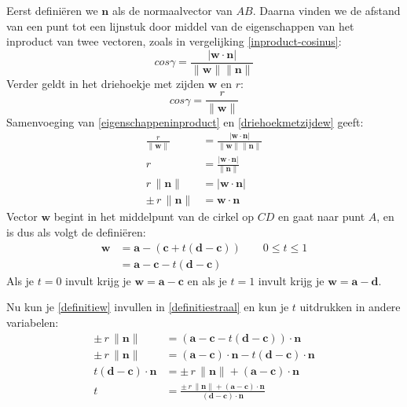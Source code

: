 \documentclass[12pt,a4paper]{article}
\begin{document}
	Eerst defini\"{e}ren we $\mathbf{n}$ als de normaalvector van $AB$. Daarna vinden we de afstand van een punt tot een lijnstuk door middel van de eigenschappen van het inproduct van twee vectoren, zoals in vergelijking \eqref{inproduct-cosinus}:
	\begin{equation}
		\label{eigenschappeninproduct}
		cos \gamma = \frac{|\mathbf{w} \cdot \mathbf{n}|}{\| \mathbf{w} \| \| \mathbf{n} \|}
	\end{equation}
	Verder geldt in het driehoekje met zijden $\mathbf{w}$ en $r$:
	\begin{equation}
		\label{driehoekmetzijdew}
		cos \gamma = \frac{r}{\| \mathbf{w}\| }
	\end{equation}
	Samenvoeging van \eqref{eigenschappeninproduct} en \eqref{driehoekmetzijdew} geeft:
	\begin{equation}
		\label{definitiestraal}
		\begin{aligned}
			\frac{r}{\| \mathbf{w}\| } &= \frac{|\mathbf{w} \cdot \mathbf{n}|}{\| \mathbf{w} \| \| \mathbf{n} \|} \\
			r &= \frac{|\mathbf{w} \cdot \mathbf{n}|}{\| \mathbf{n} \|} \\
			r \, \| \mathbf{n} \| &= |\mathbf{w} \cdot \mathbf{n}| \\
			\pm \, r \, \| \mathbf{n} \| &= \mathbf{w} \cdot \mathbf{n}
		\end{aligned}
	\end{equation}
	Vector $\mathbf{w}$ begint in het middelpunt van de cirkel op $CD$ en gaat naar punt $A$, en is dus als volgt de defini\"{e}ren:
	\begin{equation}
		\label{definitiew}
		\begin{aligned}
			\mathbf{w} &= \mathbf{a} - (\mathbf{c} + t \left(\mathbf{d} - \mathbf{c} \right)) \qquad 0 \leq t \leq 1 \\
			&= \mathbf{a} - \mathbf{c} - t \left(\mathbf{d} - \mathbf{c} \right)
		\end{aligned}
	\end{equation}
	Als je $t=0$ invult krijg je $\mathbf{w} = \mathbf{a} - \mathbf{c}$ en als je $t=1$ invult krijg je $\mathbf{w} = \mathbf{a} - \mathbf{d}$.
	
	Nu kun je \eqref{definitiew} invullen in \eqref{definitiestraal} en kun je $t$ uitdrukken in andere variabelen:
	\begin{equation}
		\begin{aligned}
			\pm \, r \, \| \mathbf{n} \| &= (\mathbf{a} - \mathbf{c} - t \left(\mathbf{d} - \mathbf{c} \right)) \cdot \mathbf{n} \\
			\pm \, r \, \| \mathbf{n} \| &= (\mathbf{a} - \mathbf{c}) \cdot \mathbf{n} - t \left(\mathbf{d} - \mathbf{c} \right) \cdot \mathbf{n} \\
			t \left(\mathbf{d} - \mathbf{c} \right) \cdot \mathbf{n} &= \pm \, r \, \| \mathbf{n} \| + (\mathbf{a} - \mathbf{c}) \cdot \mathbf{n} \\
			t &= \frac{\pm \, r \, \| \mathbf{n} \| + (\mathbf{a} - \mathbf{c}) \cdot \mathbf{n}}{\left(\mathbf{d} - \mathbf{c} \right) \cdot \mathbf{n}}
		\end{aligned}
	\end{equation}
	
\end{document}

